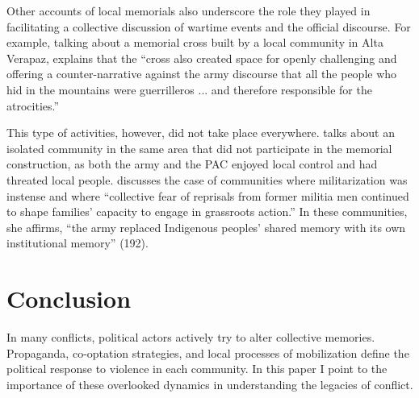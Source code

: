 \documentclass[12pt, notitlepage]{article}
\begin{document}
Other accounts of local memorials also underscore the role they played in facilitating a collective discussion of wartime events and the official discourse.
For example, talking about a memorial cross built by a local community in Alta Verapaz, \citet[170--171]{Viaene:2011td} explains that the ``cross also created space for openly challenging and offering a counter-narrative against the army discourse that all the people who hid in the mountains were guerrilleros ... and therefore responsible for the atrocities.''

This type of activities, however, did not take place everywhere. \citet{Viaene:2011td} talks about an isolated community in the same area that did not participate in the memorial construction, as both the army and the PAC enjoyed local control and had threated local people.
\citep[178]{Esparza:2018uw} discusses the case of communities where militarization was instense and where ``collective fear of reprisals from former militia men continued to shape families' capacity to engage in grassroots action.'' In these communities, she affirms, ``the army replaced Indigenous peoples' shared memory with its own institutional memory'' (192).


\section*{Conclusion}

In many conflicts, political actors actively try to alter collective memories.
Propaganda, co-optation strategies, and local processes of mobilization define the political response to violence in each community.
In this paper I point to the importance of these overlooked dynamics in understanding the legacies of conflict.
\end{document}
